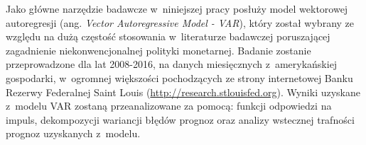 Jako główne narzędzie badawcze w~niniejszej pracy posłuży model wektorowej autoregresji (ang. \textit{Vector Autoregressive Model - VAR}), który został wybrany ze względu na dużą częstość stosowania w~literaturze badawczej poruszającej zagadnienie niekonwencjonalnej polityki monetarnej. Badanie zostanie przeprowadzone dla lat 2008-2016, na danych miesięcznych z~amerykańskiej gospodarki, w~ogromnej większości pochodzących ze strony internetowej Banku Rezerwy Federalnej Saint Louis (\url{http://research.stlouisfed.org}). Wyniki uzyskane z~modelu \acs{VAR} zostaną przeanalizowane za pomocą: funkcji odpowiedzi na impuls, dekompozycji wariancji błędów prognoz oraz analizy wstecznej trafności prognoz uzyskanych z~modelu.